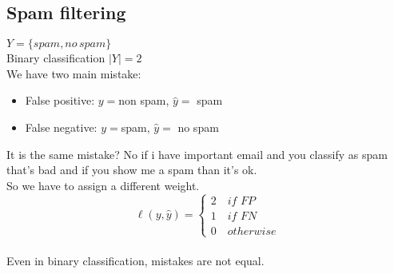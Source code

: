 \documentclass[../main.tex]{subfiles}
\begin{document}
\subsection{Spam filtering}
$Y = \{ spam, no \, spam\}$
\\
Binary classification $|Y| = 2$ \\
We have two main mistake:
\begin{itemize}
\item False positive: $y = $non spam, $\hat{y} = $ spam 
\item False negative: $y = $spam, $\hat{y} = $ no spam
\end{itemize}
It is the same mistake? No if i have important email and you classify as spam
that’s bad and if you show me a spam than it’s ok.\\
So we have to assign a different weight.\\
$$
\ell\left(y,\hat{y}\right) = \begin{cases}
2 \quad \textit{if FP}\\
1 \quad \textit{if FN}\\
0 \quad otherwise
\end{cases}
$$
\\
Even in binary classification, mistakes are not equal.
\end{document}

